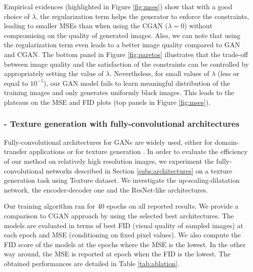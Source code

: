 Empirical evidences (highlighted in Figure \ref{fig:mses}) show that with a good choice of $\lambda$, the regularization term helps the generator to enforce the constraints, leading to smaller \ac{MSE}s than when using the \ac{CGAN} ($\lambda=0$) without compromising on the quality of generated images. Also, we can note that using the regularization term even leads to a better image quality compared to \ac{GAN} and \ac{CGAN}.
%
The bottom panel in Figure \ref{fig:paretos} illustrates that the trade-off between image quality and the satisfaction of the constraints can be controlled by appropriately setting the value of $\lambda$. Nevertheless, for small values of $\lambda$ (less or equal to $10^{-1}$), our GAN model fails to learn meaningful distribution of the training images and only generates uniformly black images. This leads to the plateaus on the \ac{MSE} and \ac{FID} plots (top panels in Figure \ref{fig:mses}).





\subsubsection{- Texture generation with fully-convolutional architectures}
\label{sub:fcnn}
Fully-convolutional architectures for GANs are widely used, either for domain-transfer applications \citep{Zhu2017, Isola2016} or for texture generation \citep{Jetchev2017}. In order to evaluate the efficiency of our method on relatively high resolution images, we experiment the fully-convolutional networks described in Section \ref{subs:architectures} on a texture generation task using Texture dataset. We investigate the up-scaling-dilatation network, the encoder-decoder one and the ResNet-like architectures.

Our training algorithm ran for 40 epochs on all reported results. We provide a comparison to CGAN \citep{Mirza2014} approach by using the selected best architectures.
The models are evaluated in terms of best FID (visual quality of sampled images) at each epoch and MSE (conditioning on fixed pixel values).  We also compute the FID score of the models at the epochs where the MSE is the lowest. In the other way around, the MSE is reported at epoch when the FID is the lowest. The obtained performances are detailed in Table \ref{tab:ablation}.

